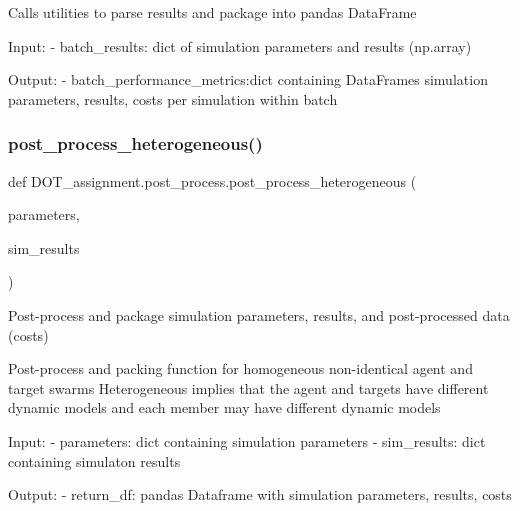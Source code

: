 \begin{DoxyVerb}Calls utilities to parse results and package into pandas DataFrame

Input:
- batch_results:            dict of simulation parameters and results (np.array)

Output:
- batch_performance_metrics:dict containing DataFrames simulation parameters, results, costs per simulation within
batch\end{DoxyVerb}
 \mbox{\label{namespace_d_o_t__assignment_1_1post__process_a0c208c013680627d4b74a80c959ff6e4}} 
\subsubsection{\texorpdfstring{post\_process\_heterogeneous()}{post\_process\_heterogeneous()}}
{\footnotesize\ttfamily def D\+O\+T\+\_\+assignment.\+post\+\_\+process.\+post\+\_\+process\+\_\+heterogeneous (\begin{DoxyParamCaption}\item[{}]{parameters,  }\item[{}]{sim\+\_\+results }\end{DoxyParamCaption})}

\begin{DoxyVerb}Post-process and package simulation parameters, results, and post-processed data (costs)

Post-process and packing function for homogeneous non-identical agent and target swarms
Heterogeneous implies that the agent and targets have different dynamic models and each member may have different dynamic models

Input:
- parameters:           dict containing simulation parameters
- sim_results:          dict containing simulaton results

Output:
- return_df:            pandas Dataframe with simulation parameters, results, costs\end{DoxyVerb}
 \mbox{\label{namespace_d_o_t__assignment_1_1post__process_ae71799543cb6119a9650663972df1840}} 
